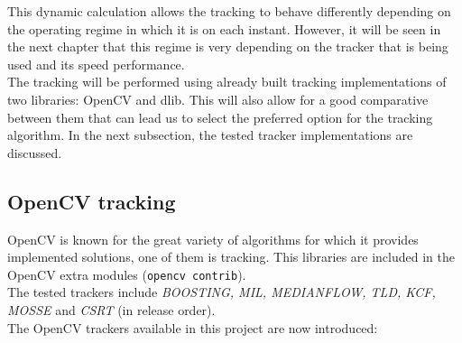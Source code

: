 This dynamic calculation allows the tracking to behave differently depending on the operating regime in which it is on each instant. However, it will be seen in the next chapter that this regime is very depending on the tracker that is being used and its speed performance.\\
The tracking will be performed using already built tracking implementations of two libraries: OpenCV and dlib. This will also allow for a good comparative between them that can lead us to select the preferred option for the tracking algorithm. In the next subsection, the tested tracker implementations are discussed.
\subsection{OpenCV tracking}
OpenCV is known for the great variety of algorithms for which it provides implemented solutions, one of them is tracking. This libraries are included in the OpenCV extra modules (\texttt{opencv contrib}).\\
The tested trackers include \textit{BOOSTING, MIL, MEDIANFLOW, TLD, KCF, MOSSE} and \textit{CSRT} (in release order).
\\
The OpenCV trackers available in this project are now introduced:
